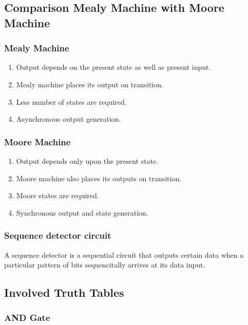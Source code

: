 \documentclass[11pt]{article}
\begin{document}
\subsection{Comparison Mealy Machine with Moore Machine}
\subsubsection{Mealy Machine}
\begin{enumerate}
	\item Output depends on the present state as well as present input.
	\item Mealy machine places its output on transition.
	\item Less number of states are required.
	\item Asynchronous output generation.
\end{enumerate}

\subsubsection{Moore Machine}
\begin{enumerate}
	\item Output depends only upon the present state.
	\item Moore machine also places its outputs on transition.
	\item Moore states are required.
	\item Synchronous output and state generation.
\end{enumerate}
\subsubsection{Sequence detector circuit}

A sequence detector is a sequential circuit that outputs certain data when a particular pattern of bits sequencitally arrives at its data input.

\subsection{Involved Truth Tables}

\subsubsection{AND Gate}
\end{document}

